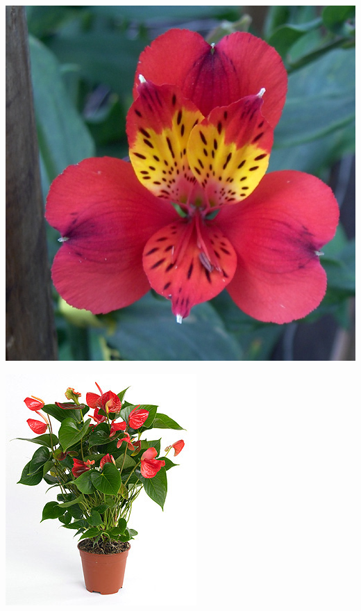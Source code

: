 \documentclass{article}
\begin{document}
\begin{center}
\includegraphics[height=0.9\textheight, angle=90]{../Alstroemeria2.jpg}
\end{center}
\newpage

\begin{center}
\includegraphics[height=0.9\textheight, angle=90]{../Anthurium.jpg}
\end{center}
\newpage
\end{document}
